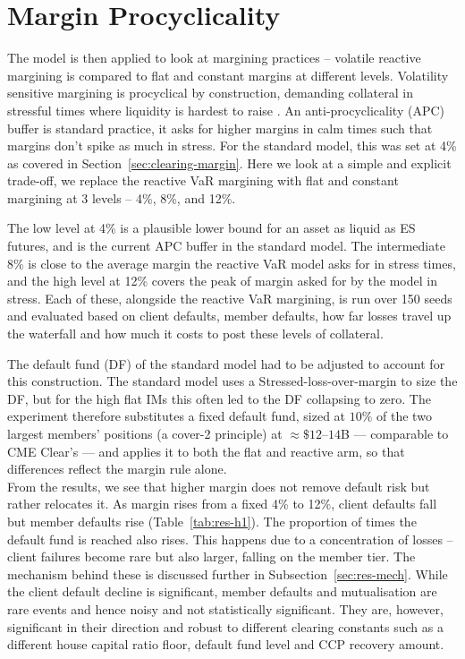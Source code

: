 \section{Margin Procyclicality}\label{sec:resh1}

The model is then applied to look at margining practices -- volatile reactive margining is compared to flat and constant margins at different levels. Volatility sensitive margining is procyclical by construction, demanding collateral in stressful times where liquidity is hardest to raise \citep{brunnermeier_pedersen_2009,glasserman_wu_2018}. An anti-procyclicality (APC) buffer is standard practice, it asks for higher margins in calm times such that margins don't spike as much in stress. For the standard model, this was set at 4\% as covered in Section~\ref{sec:clearing-margin}. Here we look at a simple and explicit trade-off, we replace the reactive VaR margining with flat and constant margining at 3 levels -- 4\%, 8\%, and 12\%. 

The low level at 4\% is a plausible lower bound for an asset as liquid as ES futures, and is the current APC buffer in the standard model. The intermediate 8\% is close to the average margin the reactive VaR model asks for in stress times, and the high level at 12\% covers the peak of margin asked for by the model in stress. Each of these, alongside the reactive VaR margining, is run over 150 seeds and evaluated based on client defaults, member defaults, how far losses travel up the waterfall and how much it costs to post these levels of collateral.

The default fund (DF) of the standard model had to be adjusted to account for this construction. The standard model uses a Stressed-loss-over-margin to size the DF, but for the high flat IMs this often led to the DF collapsing to zero. The experiment therefore substitutes a fixed default fund, sized at $10\%$ of the two largest
members' positions (a cover-2 principle) at $\approx\$12$--$14$B --- comparable to CME Clear's --- and
applies it to both the flat and reactive arm, so that differences reflect the
margin rule alone.\\

\noindent From the results, we see that higher margin does not remove default risk but rather relocates it. As margin rises from a fixed 4\% to 12\%, client defaults fall but member defaults rise (Table~\ref{tab:res-h1}). The proportion of times the default fund is reached also rises. This happens due to a concentration of losses -- client failures become rare but also larger, falling on the member tier. The mechanism behind these is discussed further in Subsection~\ref{sec:res-mech}. While the client default decline is significant, member defaults and mutualisation are rare events and hence noisy and not statistically significant. They are, however, significant in their direction and robust to different clearing constants such as a different house capital ratio floor, default fund level and CCP recovery amount. 

